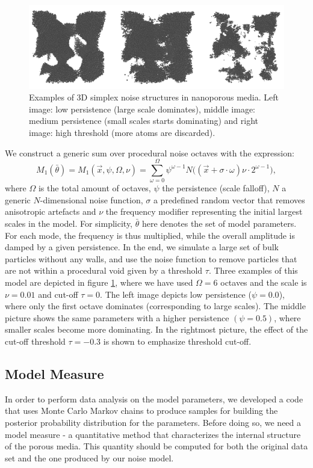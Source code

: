 \documentclass[aps,pre,twocolumn,letterpaper,floatfix,showpacs]{revtex4}
\begin{document}
\begin{figure}
\includegraphics[width=.95\textwidth]{model_examples.png}
\caption{Examples of 3D simplex noise structures in nanoporous media. Left image: low persistence (large scale dominates), middle image: medium persistence (small scales starts dominating) and right image: high threshold (more atoms are discarded). }
\label{fig:model_example}
\end{figure}
We construct a generic sum over procedural noise octaves with the expression: 
\begin{equation}
  M_1(\bar \theta) = M_1(\vec x, \psi, \Omega, \nu) = \sum_{\omega=0}^{\Omega} \psi^{\omega -1}   N\big((\vec x + \sigma \cdot \omega)\nu \cdot 2^{\omega-1} \big),
\label{eq:noisemodel1}
\end{equation}
where $\Omega$ is the total amount of octaves, $\psi$ the persistence (scale falloff), $N$ a generic $N$-dimensional noise function, $\sigma$ a predefined random vector that removes anisotropic artefacts and $\nu$ the frequency modifier representing the initial largest scales in the model. For simplicity, $\bar \theta$ here denotes the set of model parameters. For each mode, the frequency is thus multiplied, while the overall amplitude is damped by a given persistence. In the end, we simulate a large set of bulk particles without any walls, and use the noise function to remove particles that are not within a procedural void given by a threshold $\tau$. Three examples of this model are depicted in figure \ref{fig:model_example}, where we have used $\Omega=6$ octaves and the scale is $\nu=0.01$ and cut-off $\tau=0$. The left image depicts low persistence ($\psi = 0.0$), where only the first octave dominates (corresponding to large scales). The middle picture shows the same parameters with a higher persistence $(\psi = 0.5)$, where smaller scales become more dominating. In the rightmost picture, the effect of the cut-off threshold $\tau = -0.3$ is shown to emphasize threshold cut-off. 


\subsection{Model Measure}
In order to perform data analysis on the model parameters, we developed a code that uses Monte Carlo Markov chains to produce samples for building the posterior probability distribution for the parameters. Before doing so, we need a model measure - a quantitative method that characterizes the internal structure of the porous media. This quantity should be computed for both the original data set and the one produced by our noise model. 
\end{document}
